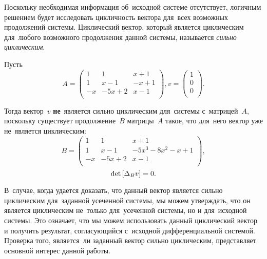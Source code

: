 \newpage
Поскольку необходимая информация об~исходной системе отсутствует,
логичным решением будет исследовать цикличность вектора для~всех возможных продолжений системы.
Циклический вектор, который является циклическим для~любого возможного продолжения данной системы,
называется \emph{сильно циклическим}.

\begin{example}
Пусть
	\begin{equation*}
		A = 
		\begin{pmatrix}
			1 & 1 & x + 1 \\
			1 & x - 1 & -x + 1 \\
			-x & -5x + 2 & x - 1 \\
		\end{pmatrix},
		v =
		\begin{pmatrix}
			1 \\
			0 \\
			0 \\
		\end{pmatrix}.
	\end{equation*}
    
	Тогда вектор~$v$ \textbf{не}~является сильно циклическим для~системы с~матрицей~$A$,
    поскольку существует продолжение~$B$ матрицы~$A$ такое,
    что для~него вектор уже не~является циклическим:
	\begin{equation*}
		B = 
		\begin{pmatrix}
			1 & 1 & x + 1 \\
			1 & x - 1 & -5x^3 -8x^2 -x + 1 \\
			-x & -5x + 2 & x - 1 \\
		\end{pmatrix},
	\end{equation*}
    \begin{equation*}
		\mathop{\rm det}\text{$ [\Delta_B v] $} = 0.
	\end{equation*}
\end{example}

В~случае, когда удается доказать, что данный вектор является сильно циклическим для~заданной усеченной системы,
мы можем утверждать, что он является циклическим не~только для~усеченной системы, но и для~исходной системы.
Это означает, что мы можем использовать данный циклический вектор и получить результат,
согласующийся с~исходной дифференциальной системой.
Проверка того, является~ли заданный вектор сильно циклическим, представляет основной интерес данной работы.
